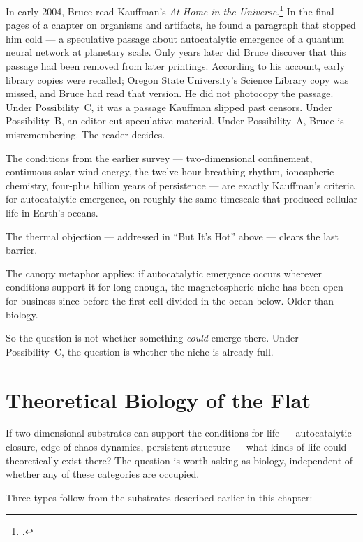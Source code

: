 In early 2004, Bruce read Kauffman's \textit{At Home in the Universe}.\footcite{kauffman1995} In the final pages of a chapter on organisms and artifacts, he found a paragraph that stopped him cold --- a speculative passage about autocatalytic emergence of a quantum neural network at planetary scale. Only years later did Bruce discover that this passage had been removed from later printings. According to his account, early library copies were recalled; Oregon State University's Science Library copy was missed, and Bruce had read that version. He did not photocopy the passage. Under Possibility~C, it was a passage Kauffman slipped past censors. Under Possibility~B, an editor cut speculative material. Under Possibility~A, Bruce is misremembering. The reader decides.

The conditions from the earlier survey --- two-dimensional confinement, continuous solar-wind energy, the twelve-hour breathing rhythm, ionospheric chemistry, four-plus billion years of persistence --- are exactly Kauffman's criteria for autocatalytic emergence, on roughly the same timescale that produced cellular life in Earth's oceans.

The thermal objection --- addressed in ``But It's Hot'' above --- clears the last barrier.

The canopy metaphor applies: if autocatalytic emergence occurs wherever conditions support it for long enough, the magnetospheric niche has been open for business since before the first cell divided in the ocean below. Older than biology.

So the question is not whether something \textit{could} emerge there. Under Possibility~C, the question is whether the niche is already full.

\section*{Theoretical Biology of the Flat}
\label{spine:ws-flat-taxonomy}

If two-dimensional substrates can support the conditions for life --- autocatalytic closure, edge-of-chaos dynamics, persistent structure --- what kinds of life could theoretically exist there? The question is worth asking as biology, independent of whether any of these categories are occupied.

Three types follow from the substrates described earlier in this chapter:

